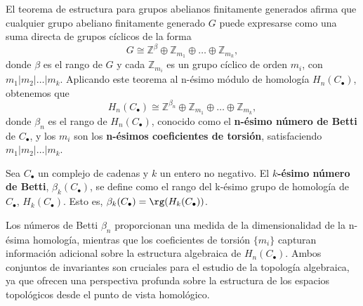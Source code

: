 El teorema de estructura para grupos abelianos finitamente generados afirma que cualquier grupo abeliano finitamente generado \( G \) puede expresarse como una suma directa de grupos cíclicos de la forma
\[ G \cong \mathbb{Z}^{\beta} \oplus \mathbb{Z}_{m_1} \oplus \ldots \oplus \mathbb{Z}_{m_k}, \]
donde \( \beta \) es el rango de \( G \) y cada \( \mathbb{Z}_{m_i} \) es un grupo cíclico de orden \( m_i \), con \( m_1 | m_2 | \ldots | m_k \). Aplicando este teorema al n-ésimo módulo de homología \( H_n(C_{\bullet}) \), obtenemos que
\[ H_n(C_{\bullet}) \cong \mathbb{Z}^{\beta_n} \oplus \mathbb{Z}_{m_1} \oplus \ldots \oplus \mathbb{Z}_{m_k}, \]
donde \( \beta_n \) es el rango de \( H_n(C_{\bullet}) \), conocido como el \textbf{n-ésimo número de Betti} de \( C_{\bullet} \), y los \( m_i \) son los \textbf{n-ésimos coeficientes de torsión}, satisfaciendo \( m_1 | m_2 | \ldots | m_k \).
\begin{definicion}
	Sea \(C_{\bullet}\) un complejo de cadenas y \(k\) un entero no negativo. El \textbf{$k$-ésimo número de Betti}, \(\beta_k(C_{\bullet})\), se define como el rango del k-ésimo grupo de homología de \(C_{\bullet}\), \(H_k(C_{\bullet})\). Esto es, \(\beta_k(C_{\bullet}) = \rg(H_k(C_{\bullet}))\).
\end{definicion}
Los números de Betti \( \beta_n \) proporcionan una medida de la dimensionalidad de la n-ésima homología, mientras que los coeficientes de torsión \( \{m_i\} \) capturan información adicional sobre la estructura algebraica de \( H_n(C_{\bullet}) \). Ambos conjuntos de invariantes son cruciales para el estudio de la topología algebraica, ya que ofrecen una perspectiva profunda sobre la estructura de los espacios topológicos desde el punto de vista homológico.
%

\endinput
